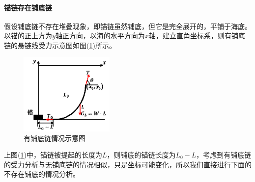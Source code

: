             \paragraph{锚链存在铺底链}假设铺底链不存在堆叠现象，即锚链虽然铺底，但它是完全展开的，平铺于海底。以锚的正上方为$y$轴正方向，以海的水平方向为$x$轴，建立直角坐标系，则有铺底链的悬链线受力示意图如图(\ref{fig:有铺底链情况示意图})所示。
            \begin{figure}[H]
            \centering
            \includegraphics[height=4cm]{images/bottom_chain.jpg}
            \caption{有铺底链情况示意图}
            \label{fig:有铺底链情况示意图}
            \end{figure}
            \par
            上图(\ref{fig:有铺底链情况示意图})中，锚链被提起的长度为$L$，则铺底的锚链长度为$L_0-L$，考虑到有铺底链的受力分析与无铺底链的情况相似，只是坐标可能变化，所以我们直接进行下面的不存在铺底的情况分析。
